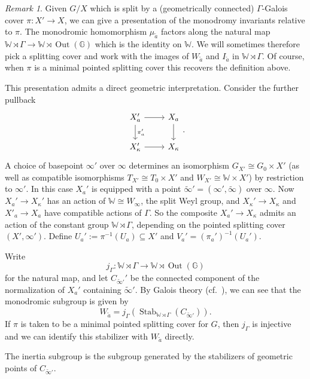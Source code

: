 \documentclass[openany]{amsbook}
\theoremstyle{definition}
\theoremstyle{remark}
\newtheorem{remark}[theorem]{Remark}
\numberwithin{equation}{section}
\newcommand{\G}{\mathbb{G}}
\newcommand{\W}{\mathbb{W}}
\renewcommand{\-}{\operatorname{-}}
\newcommand{\Out}{\operatorname{Out}}
\newcommand{\on}[1]{\operatorname{#1}}
\newcommand{\wtilde}[1]{\widetilde{#1}}
\begin{document}
\begin{remark}\label{rmk.monodr.inv.spl}
Given $G/X$ which is split by a (geometrically connected) $\Gamma$-Galois cover $\pi: X' \to X$, we can give a presentation of the monodromy invariants relative to $\pi$. The monodromic homomorphism $\mu_{\wtilde{a}}$ factors along the natural map $\W \rtimes \Gamma \to \W \rtimes \Out(\G)$ which is the identity on $\W$. We will sometimes therefore pick a splitting cover and work with the images of $W_{\wtilde{a}}$ and $I_{\wtilde{a}}$ in $\W \rtimes \Gamma$. Of course, when $\pi$ is a minimal pointed splitting cover this recovers the definition above. 

This presentation admits a direct geometric interpretation. Consider the further pullback
\begin{equation} \label{eqn.spec.curve.II}
    \begin{tikzcd}[ampersand replacement=\&]
        X_a' \ar[r] \ar[d, "\pi_a'"] \& X_a \ar[d] \\
        X'_{\kappa} \ar[r] \& X_{\kappa}
    \end{tikzcd}.
\end{equation}
A choice of basepoint $\infty'$ over $\infty$ determines an isomorphism $G_{X'} \cong G_0 \times X'$ (as well as compatible isomorphisms $T_{X'} \cong T_0 \times X'$ and $W_{X'} \cong \W \times X'$) by restriction to $\infty'$. In this case $X_a'$ is equipped with a point $\wtilde{\infty}' = (\infty', \wtilde{\infty})$ over $\infty$. Now $X_a' \to X_\kappa'$ has an action of $\W \cong W_{\infty}$, the split Weyl group, and $X_\kappa' \to X_\kappa$ and $X'_a \to X_a$ have compatible actions of $\Gamma$. So the composite $X_a' \to X_\kappa$ admits an action of the constant group $\W \rtimes \Gamma$, depending on the pointed splitting cover $(X', \infty')$. Define $U_a' := \pi^{-1}(U_a) \subseteq X'$ and $V_a' = (\pi_a')^{-1}(U_a')$.


Write 
$$
    j_\Gamma : \W \rtimes \Gamma \to \W \rtimes \Out(\G)
$$
for the natural map, and let $C_{\wtilde{\infty}'}'$ be the connected component of the normalization of $X_a'$ containing $\wtilde{\infty}'$. By Galois theory (cf.\ {{\cite[1.3.6, 5.4.1, 5.4.2]{ngofl}}}), we can see that the monodromic subgroup is given by $$W_{\wtilde{a}} = j_\Gamma(\on{Stab}_{\W \rtimes \Gamma}(C_{\wtilde{\infty}'})).$$ 
If $\pi$ is taken to be a minimal pointed splitting cover for $G$, then $j_{\Gamma}$ is injective and we can identify this stabilizer with $W_{\wtilde{a}}$ directly.

The inertia subgroup is the subgroup generated by the stabilizers of geometric points of $C_{\wtilde{\infty}'}$. 
\end{remark}
\end{document}
